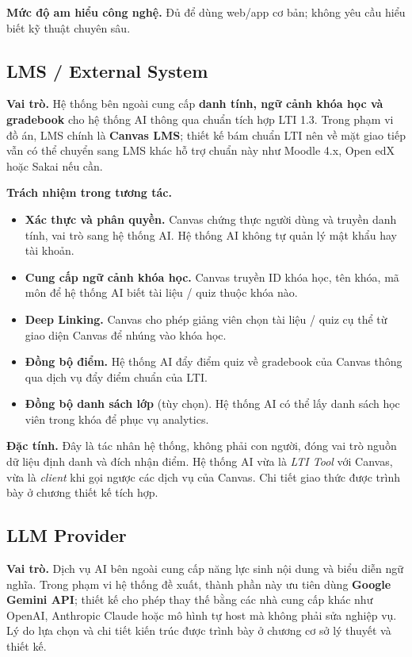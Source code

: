 \textbf{Mức độ am hiểu công nghệ.} Đủ để dùng web/app cơ bản; không yêu cầu
hiểu biết kỹ thuật chuyên sâu.

\subsection{LMS / External System}

\textbf{Vai trò.} Hệ thống bên ngoài cung cấp \textbf{danh tính, ngữ cảnh khóa
học và gradebook} cho hệ thống AI thông qua chuẩn tích hợp LTI 1.3. Trong phạm
vi đồ án, LMS chính là \textbf{Canvas LMS}; thiết kế bám chuẩn LTI nên về mặt
giao tiếp vẫn có thể chuyển sang LMS khác hỗ trợ chuẩn này như Moodle 4.x,
Open edX hoặc Sakai nếu cần.

\textbf{Trách nhiệm trong tương tác.}

\begin{itemize}
    \item \textbf{Xác thực và phân quyền.} Canvas chứng thực người dùng và
          truyền danh tính, vai trò sang hệ thống AI. Hệ thống AI không tự quản
          lý mật khẩu hay tài khoản.
    \item \textbf{Cung cấp ngữ cảnh khóa học.} Canvas truyền ID khóa học, tên
          khóa, mã môn để hệ thống AI biết tài liệu / quiz thuộc khóa nào.
    \item \textbf{Deep Linking.} Canvas cho phép giảng viên chọn tài liệu /
          quiz cụ thể từ giao diện Canvas để nhúng vào khóa học.
    \item \textbf{Đồng bộ điểm.} Hệ thống AI đẩy điểm quiz về gradebook của
          Canvas thông qua dịch vụ đẩy điểm chuẩn của LTI.
    \item \textbf{Đồng bộ danh sách lớp} (tùy chọn). Hệ thống AI có thể lấy
          danh sách học viên trong khóa để phục vụ analytics.
\end{itemize}

\textbf{Đặc tính.} Đây là tác nhân hệ thống, không phải con người, đóng vai trò
nguồn dữ liệu định danh và đích nhận điểm. Hệ thống AI vừa là \textit{LTI Tool}
với Canvas, vừa là \textit{client} khi gọi ngược các dịch vụ của Canvas. Chi
tiết giao thức được trình bày ở chương thiết kế tích hợp.

\subsection{LLM Provider}

\textbf{Vai trò.} Dịch vụ AI bên ngoài cung cấp năng lực sinh nội dung và biểu
diễn ngữ nghĩa. Trong phạm vi hệ thống đề xuất, thành phần này ưu tiên dùng
\textbf{Google Gemini API}; thiết kế cho phép thay thế bằng các nhà cung cấp
khác như OpenAI, Anthropic Claude hoặc mô hình tự host mà không phải sửa nghiệp
vụ. Lý do lựa chọn và chi tiết kiến trúc được trình bày ở chương cơ sở lý
thuyết và thiết kế.

